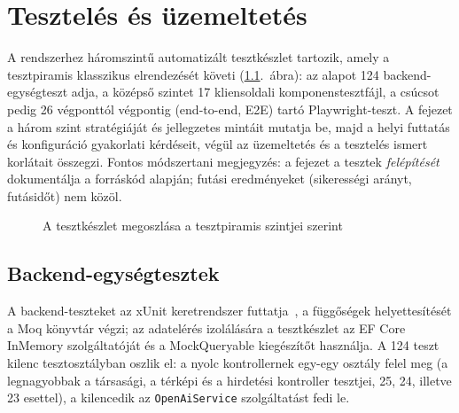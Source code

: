 
\chapter{Tesztelés és üzemeltetés}
\label{chap:teszteles}

A rendszerhez háromszintű automatizált tesztkészlet tartozik, amely a tesztpiramis klasszikus
elrendezését követi (\ref{fig:tesztpiramis}.~ábra): az alapot 124 backend-egységteszt adja, a
középső szintet 17 kliensoldali komponenstesztfájl, a csúcsot pedig 26 végponttól végpontig
(end-to-end, E2E) tartó Playwright-teszt. A fejezet a három szint stratégiáját és jellegzetes
mintáit mutatja be, majd a helyi futtatás és konfiguráció gyakorlati kérdéseit, végül az
üzemeltetés és a tesztelés ismert korlátait összegzi. Fontos módszertani megjegyzés: a fejezet
a tesztek \emph{felépítését} dokumentálja a forráskód alapján; futási eredményeket
(sikerességi arányt, futásidőt) nem közöl.

\begin{figure}[htbp]
	\centering
	\caption{A tesztkészlet megoszlása a tesztpiramis szintjei szerint}
	\label{fig:tesztpiramis}
\end{figure}

\section{Backend-egységtesztek}
\label{sec:teszt-backend}

A backend-teszteket az xUnit keretrendszer futtatja~\cite{xunitdocs}, a függőségek
helyettesítését a Moq könyvtár végzi; az adatelérés izolálására a tesztkészlet az EF Core
InMemory szolgáltatóját és a MockQueryable kiegészítőt használja. A 124 teszt kilenc
tesztosztályban oszlik el: a nyolc kontrollernek egy-egy osztály felel meg (a legnagyobbak a
társasági, a térképi és a hirdetési kontroller tesztjei, 25, 24, illetve 23 esettel), a
kilencedik az \texttt{OpenAiService} szolgáltatást fedi le.

